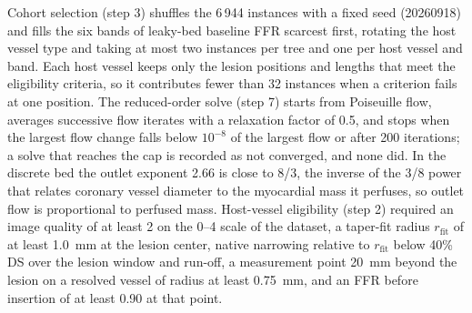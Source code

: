 \documentclass[journal,twoside,web,onecolumn]{ieeecolor}
\begin{document}
Cohort selection (step 3) shuffles the 6\,944 instances with a fixed seed (20260918) and fills the six bands of
leaky-bed baseline FFR scarcest first, rotating the host vessel type and taking at most two instances per tree and
one per host vessel and band. Each host vessel keeps only the lesion positions and lengths that meet the eligibility
criteria, so it contributes fewer than 32 instances when a criterion fails at one position. The reduced-order solve (step 7)
starts from Poiseuille flow, averages successive flow iterates with a relaxation factor of 0.5, and stops when the
largest flow change falls below $10^{-8}$ of the largest flow or after 200 iterations; a solve that reaches the
cap is recorded as not converged, and none did.
In the discrete bed the outlet exponent 2.66 is close to 8/3, the inverse of the 3/8 power that relates coronary vessel diameter to the myocardial mass it perfuses, so outlet flow is proportional to perfused mass. Host-vessel eligibility (step 2) required an image quality of at least 2 on the 0--4 scale of the dataset, a taper-fit radius $r_\mathrm{fit}$ of at least 1.0~mm at the lesion center, native narrowing relative to $r_\mathrm{fit}$ below 40\% DS over the lesion window and run-off, a measurement point 20~mm beyond the lesion on a resolved vessel of radius at least 0.75~mm, and an FFR before insertion of at least 0.90 at that point.
\end{document}
